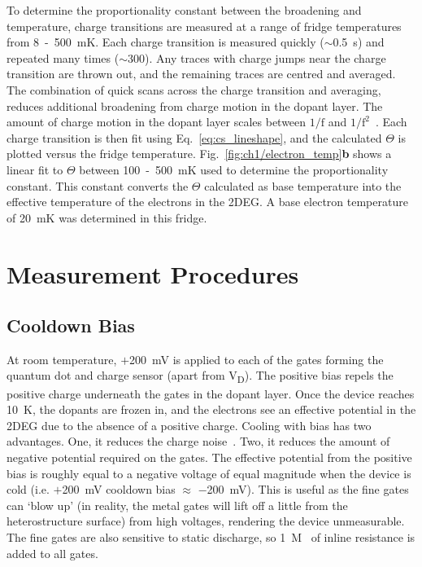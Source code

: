 To determine the proportionality constant between the broadening and temperature, charge transitions are measured at a range of fridge temperatures from \qty{8}{}~-~\qty{500}{mK}. Each charge transition is measured quickly ($\sim$\qty{0.5}{s}) and repeated many times ($\sim$\qty{300}{}). Any traces with charge jumps near the charge transition are thrown out, and the remaining traces are centred and averaged. The combination of quick scans across the charge transition and averaging, reduces additional broadening from charge motion in the dopant layer. The amount of charge motion in the dopant layer scales between $\mathrm{1/f}$ and $\mathrm{1/f^2}$~\cite{charge_noise}. Each charge transition is then fit using Eq.~\ref{eq:cs_lineshape}, and the calculated $\Theta$ is plotted versus the fridge temperature. Fig.~\ref{fig:ch1/electron_temp}\textbf{b} shows a linear fit to $\Theta$ between \qty{100}{}~-~\qty{500}{mK} used to determine the proportionality constant. This constant converts the $\Theta$ calculated as base temperature into the effective temperature of the electrons in the 2DEG. A base electron temperature of \qty{20}{mK} was determined in this fridge.



\afterpage{\clearpage}
\section{Measurement Procedures}

\subsection{Cooldown Bias}
At room temperature, $+$\qty{200}{mV} is applied to each of the gates forming the quantum dot and charge sensor (apart from V\textsubscript{D}). The positive bias repels the positive charge underneath the gates in the dopant layer. Once the device reaches \qty{10}{K}, the dopants are frozen in, and the electrons see an effective potential in the 2DEG due to the absence of a positive charge. Cooling with bias has two advantages. One, it reduces the charge noise~\cite{bias_cooling}. Two, it reduces the amount of negative potential required on the gates. The effective potential from the positive bias is roughly equal to a negative voltage of equal magnitude when the device is cold (i.e. $+$\qty{200}{mV} cooldown bias $\approx$ $-$\qty{200}{mV}). This is useful as the fine gates can `blow up' (in reality, the metal gates will lift off a little from the heterostructure surface) from high voltages, rendering the device unmeasurable. The fine gates are also sensitive to static discharge, so \qty{1}{M\Omega} of inline resistance is added to all gates.  


